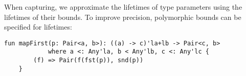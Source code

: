 \documentclass[acmsmall,review,screen]{acmart}
\begin{document}
When capturing, we approximate the lifetimes of type parameters using the
lifetimes of their bounds.
To improve precision, polymorphic bounds can
be specified for lifetimes:
\begin{lstlisting}[language=colang]
    fun mapFirst(p: Pair<a, b>): ((a) -> c)'la+lb -> Pair<c, b>
            where a <: Any'la, b < Any'lb, c <: Any'lc {
        (f) => Pair(f(fst(p)), snd(p))
    }
\end{lstlisting}

%

%
%




\end{document}
